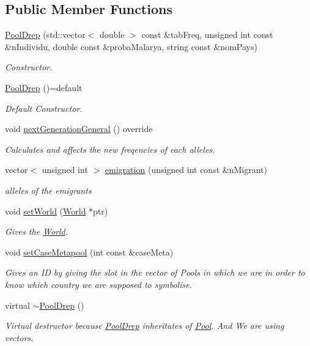 \subsection*{Public Member Functions}
\begin{DoxyCompactItemize}
\item 
\hyperlink{class_pool_drep_a04cfd52c354498fd622000e0dc683a49}{Pool\+Drep} (std\+::vector$<$ double $>$ const \&tab\+Freq, unsigned int const \&n\+Individu, double const \&proba\+Malarya, string const \&nom\+Pays)
\begin{DoxyCompactList}\small\item\em Constructor. \end{DoxyCompactList}\item 
\hyperlink{class_pool_drep_a28ae3aae52b8dca09a6828283e8019b4}{Pool\+Drep} ()=default
\begin{DoxyCompactList}\small\item\em Default Constructor. \end{DoxyCompactList}\item 
void \hyperlink{class_pool_drep_a4fba163580813690fbeb2d4ad0841a86}{next\+Generation\+General} () override
\begin{DoxyCompactList}\small\item\em Calculates and affects the new freqencies of each alleles. \end{DoxyCompactList}\item 
vector$<$ unsigned int $>$ \hyperlink{class_pool_drep_a5d13aa16dfcf87d3496518a8df67db72}{emigration} (unsigned int const \&n\+Migrant)
\begin{DoxyCompactList}\small\item\em alleles of the emigrants \end{DoxyCompactList}\item 
void \hyperlink{class_pool_drep_aa957ad7c22f08cff037e3ce92fecd663}{set\+World} (\hyperlink{class_world}{World} $\ast$ptr)
\begin{DoxyCompactList}\small\item\em Gives the \hyperlink{class_world}{World}. \end{DoxyCompactList}\item 
void \hyperlink{class_pool_drep_a64f409df1a7815bebc4744472ec7b8ce}{set\+Case\+Metapool} (int const \&case\+Meta)
\begin{DoxyCompactList}\small\item\em Gives an ID by giving the slot in the vector of Pools in which we are in order to know which country we are supposed to symbolise. \end{DoxyCompactList}\item 
virtual \hyperlink{class_pool_drep_a06de6a1171890c9902e1f5e20cd10523}{$\sim$\+Pool\+Drep} ()
\begin{DoxyCompactList}\small\item\em Virtual destructor because \hyperlink{class_pool_drep}{Pool\+Drep} inheritates of \hyperlink{class_pool}{Pool}. And We are using vectors. \end{DoxyCompactList}\end{DoxyCompactItemize}
